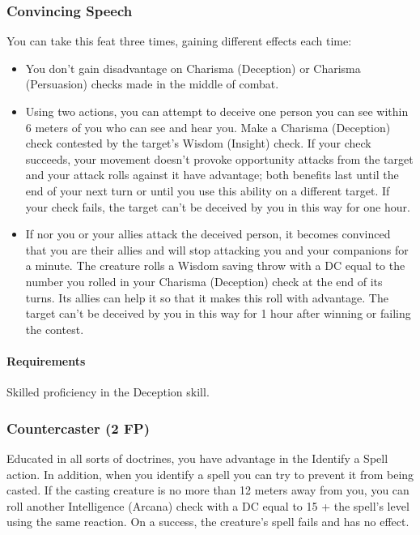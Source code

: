 \subsubsection{Convincing Speech} \label{feat::convincingspeech}
    You can take this feat three times, gaining different effects each time:
    \begin{itemize}
        \item You don't gain disadvantage on Charisma (Deception) or Charisma (Persuasion) checks made in the middle of combat.
        \item Using two actions, you can attempt to deceive one person you can see within 6 meters of you who can see and hear you.
        Make a Charisma (Deception) check contested by the target's Wisdom (Insight) check.
        If your check succeeds, your movement doesn't provoke opportunity attacks from the target and your attack rolls against it have advantage; both benefits last until the end of your next turn or until you use this ability on a different target.
        If your check fails, the target can't be deceived by you in this way for one hour.
        \item If nor you or your allies attack the deceived person, it becomes convinced that you are their allies and will stop attacking you and your companions for a minute.
        The creature rolls a Wisdom saving throw with a DC equal to the number you rolled in your Charisma (Deception) check at the end of its turns.
        Its allies can help it so that it makes this roll with advantage.
        The target can't be deceived by you in this way for 1 hour after winning or failing the contest.
    \end{itemize}
    \paragraph{Requirements} Skilled proficiency in the Deception skill.
\subsubsection{Countercaster (2 FP)} \label{feat::countercaster}
    Educated in all sorts of doctrines, you have advantage in the Identify a Spell action.
    In addition, when you identify a spell you can try to prevent it from being casted.
    If the casting creature is no more than 12 meters away from you, you can roll another Intelligence (Arcana) check with a DC equal to 15 + the spell's level using the same reaction.
    On a success, the creature's spell fails and has no effect.
